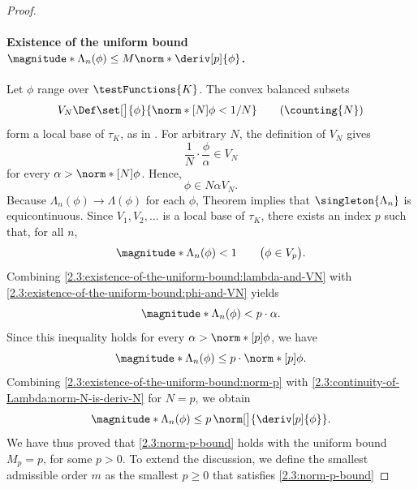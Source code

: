 \begin{proof}
\paragraph{Existence of the uniform bound 
$\magnitude*{\Lambda_n(\phi)}\leq M\norm*{\deriv[p]{\phi}}$.} 
Let $\phi$ range over $\testFunctions{K}$. The convex balanced subsets
%
\begin{equation}
  V_N \Def \set[\big]{\phi}{\norm*[N]{\phi} < 1/N} \qquad(\counting{N})
\end{equation}
%
form a local base of $\tau_K$, as in . For arbitrary $N$, the definition of $V_N$ gives
%
\begin{equation}
  \frac{1}{N} \cdot\frac{\phi}{\alpha} \in V_N
\end{equation}
%
for every $\alpha > \norm*[N]{\phi}$. Hence,
%
\begin{equation}\label{2.3:existence-of-the-uniform-bound:phi-and-VN}
  \phi \in N \alpha V_N.
\end{equation}
%
Because $\Lambda_n(\phi) \longrightarrow \Lambda(\phi)$ for each $\phi$, Theorem  implies that %
$\singleton{\Lambda_n}$ is equicontinuous. Since $V_1, V_2, \dots$ is a local base of $\tau_K$, there exists an index $p$ %
such that, for all $n$, 
% 
\begin{equation}\label{2.3:existence-of-the-uniform-bound:lambda-and-VN}
  \magnitude*{\Lambda_n (\phi)} < 1 \qquad \bigl(\phi \in V_p\bigr).
\end{equation}
% 
Combining \eqref{2.3:existence-of-the-uniform-bound:lambda-and-VN} with \eqref{2.3:existence-of-the-uniform-bound:phi-and-VN} %
yields 
% 
\begin{equation}
  \magnitude*{\Lambda_n(\phi)} < p \cdot \alpha.
\end{equation}
% 
Since this inequality holds for every $\alpha >\norm*[p]{\phi}$, we have
% 
\begin{equation} \label{2.3:existence-of-the-uniform-bound:norm-p}
  \magnitude*{\Lambda_n(\phi)} \leq %
    p \cdot \norm*[p]{\phi}. 
\end{equation}
% 
Combining \eqref{2.3:existence-of-the-uniform-bound:norm-p} with \eqref{2.3:continuity-of-Lambda:norm-N-is-deriv-N} for %
$N = p$, we obtain
% 
\begin{equation}
  \magnitude*{\Lambda_n(\phi)} \leq p \, \norm[\big]{\deriv[p]{\phi}}. 
\end{equation}
% 
We have thus proved that \eqref{2.3:norm-p-bound} holds with the uniform bound $M_p=p$, for some $p>0$. To extend the %
discussion, we define the smallest admissible order $m$ as the smallest $p \geq 0$ that satisfies \eqref{2.3:norm-p-bound} %

\end{proof}
